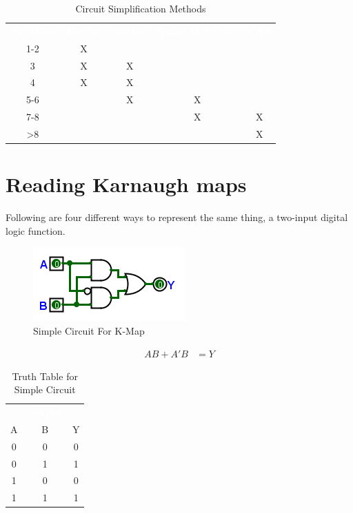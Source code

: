 \begin{table}[H]
  \sffamily
  \newcommand{\head}[1]{\textcolor{white}{\textbf{#1}}}    
  \begin{center}
    \begin{tabular}{ccccc} 
      \rowcolor{black!75}
      \head{Variables} & \head{Algebra} & \head{K-Map} & \head{Quine-McClusky} & \head{CAT} \\
      1-2 & X &   &   &   \\
      3   & X & X &   &   \\
      4   & X & X &   &   \\
      5-6 &   & X & X &   \\
      7-8 &   &   & X & X \\
      >8  &   &   &   & X
    \end{tabular}
  \end{center}
  \caption{Circuit Simplification Methods}
  \label{KM:tab:circuit_simplification_methods}
\end{table}

\section{Reading Karnaugh maps}
\label{KM:sec:reading_karnaugh_maps}

Following are four different ways to represent the same thing, a two-input digital logic function. 

\begin{figure}[H]
	\centering
	\includegraphics[width=\maxwidth{.95\linewidth}]{gfx/06_01}
	\caption{Simple Circuit For K-Map}
	\label{fig:06_01}
\end{figure}

\begin{align}
  \label{KM:eq:simple_circuit_for_karnaugh_map}
  AB+A'B &= Y
\end{align}

\begin{table}[H]
  \sffamily
  \newcommand{\head}[1]{\textcolor{white}{\textbf{#1}}}    
  \begin{center}
    \begin{tabular}{ccc} 
      \rowcolor{black!75}
      \multicolumn{2}{c}{\head{Inputs}} & \head{Output} \\
      A & B & Y \\
      \hline
      0 & 0 & 0 \\
      0 & 1 & 1 \\
      1 & 0 & 0 \\
      1 & 1 & 1 
    \end{tabular}
  \end{center}
  \caption{Truth Table for Simple Circuit}
  \label{KM:tab:truth_table_simple_circuit}
\end{table}

